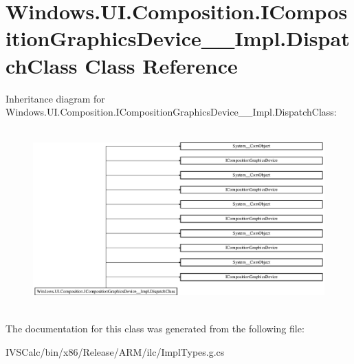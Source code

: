\hypertarget{class_windows_1_1_u_i_1_1_composition_1_1_i_composition_graphics_device_____impl_1_1_dispatch_class}{}\section{Windows.\+U\+I.\+Composition.\+I\+Composition\+Graphics\+Device\+\_\+\+\_\+\+Impl.\+Dispatch\+Class Class Reference}
\label{class_windows_1_1_u_i_1_1_composition_1_1_i_composition_graphics_device_____impl_1_1_dispatch_class}
Inheritance diagram for Windows.\+U\+I.\+Composition.\+I\+Composition\+Graphics\+Device\+\_\+\+\_\+\+Impl.\+Dispatch\+Class\+:\begin{figure}[H]
\begin{center}
\leavevmode
\includegraphics[height=6.952596cm]{class_windows_1_1_u_i_1_1_composition_1_1_i_composition_graphics_device_____impl_1_1_dispatch_class}
\end{center}
\end{figure}


The documentation for this class was generated from the following file\+:\begin{DoxyCompactItemize}
\item 
I\+V\+S\+Calc/bin/x86/\+Release/\+A\+R\+M/ilc/Impl\+Types.\+g.\+cs\end{DoxyCompactItemize}
